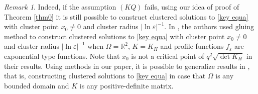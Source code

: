 \documentclass[12pt,reqno]{amsart}
\numberwithin{equation}{section}
\theoremstyle{definition}
\theoremstyle{remark}
\newtheorem{remark}[theorem]{Remark}
\begin{document}
\begin{remark}
Indeed, if the assumption $ (KQ) $ fails, using our idea of proof of Theorem \ref{thm0} it is still possible to construct clustered solutions to \eqref{key equa} with cluster point $ x_0\neq 0  $ and cluster radius $ |\ln\varepsilon|^{-1} $. In \cite{GM}, the authors used gluing method to construct clustered solutions to \eqref{key equa} with cluster point $ x_0\neq 0  $ and cluster radius $ |\ln\varepsilon|^{-1} $ when $ \Omega=\mathbb{R}^2 $, $ K=K_H $ and profile functions $ f_\varepsilon  $ are exponential type functions. Note that $ x_0 $ is not a critical point of $ q^2\sqrt{\det K_H} $ in their results. Using methods in our paper, it is possible to generalize results in \cite{GM}, that is, constructing clustered solutions to \eqref{key equa} in case that  $ \Omega $ is  any bounded domain and $ K $ is any positive-definite matrix.

\end{remark}
\end{document}
